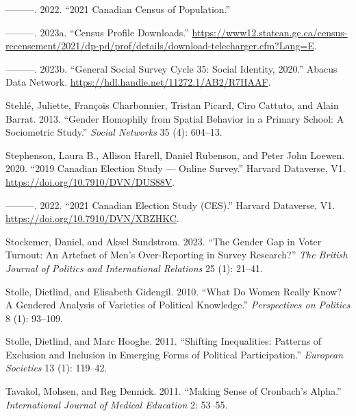 \documentclass[
  letterpaper,
  DIV=11,
  numbers=noendperiod]{scrreprt}
\newlength{\cslhangindent}
\newlength{\cslentryspacingunit} %
\newenvironment{CSLReferences}[2] %
 {%
  \setlength{\parindent}{0pt}
  \ifodd #1
  \let\oldpar\par
  \def\par{\hangindent=\cslhangindent\oldpar}
  \fi
  \setlength{\parskip}{#2\cslentryspacingunit}
 }%
 {}
\begin{document}
\begin{CSLReferences}{1}{0}
\leavevmode{}%
---------. 2022. {``{2021 Canadian Census of Population}.''}

\leavevmode{}%
---------. 2023a. {``{Census Profile Downloads}.''}
\url{https://www12.statcan.gc.ca/census-recensement/2021/dp-pd/prof/details/download-telecharger.cfm?Lang=E}.

\leavevmode{}%
---------. 2023b. {``{General Social Survey Cycle 35: Social Identity,
2020}.''} Abacus Data Network.
\url{https://hdl.handle.net/11272.1/AB2/R7HAAF}.

\leavevmode{}%
Stehlé, Juliette, François Charbonnier, Tristan Picard, Ciro Cattuto,
and Alain Barrat. 2013. {``{Gender Homophily from Spatial Behavior in a
Primary School: A Sociometric Study}.''} \emph{Social Networks} 35 (4):
604--13.

\leavevmode{}%
Stephenson, Laura B., Allison Harell, Daniel Rubenson, and Peter John
Loewen. 2020. {``{2019 Canadian Election Study --- Online Survey}.''}
Harvard Dataverse, V1. \url{https://doi.org/10.7910/DVN/DUS88V}.

\leavevmode{}%
---------. 2022. {``{2021 Canadian Election Study (CES)}.''} Harvard
Dataverse, V1. \url{https://doi.org/10.7910/DVN/XBZHKC}.

\leavevmode{}%
Stockemer, Daniel, and Aksel Sundstrom. 2023. {``{The Gender Gap in
Voter Turnout: An Artefact of Men's Over-Reporting in Survey
Research?}''} \emph{The British Journal of Politics and International
Relations} 25 (1): 21--41.

\leavevmode{}%
Stolle, Dietlind, and Elisabeth Gidengil. 2010. {``{What Do Women Really
Know? A Gendered Analysis of Varieties of Political Knowledge}.''}
\emph{Perspectives on Politics} 8 (1): 93--109.

\leavevmode{}%
Stolle, Dietlind, and Marc Hooghe. 2011. {``{Shifting Inequalities:
Patterns of Exclusion and Inclusion in Emerging Forms of Political
Participation}.''} \emph{European Societies} 13 (1): 119--42.

\leavevmode{}%
Tavakol, Mohsen, and Reg Dennick. 2011. {``{Making Sense of Cronbach's
Alpha}.''} \emph{International Journal of Medical Education} 2: 53--55.


\end{CSLReferences}
\end{document}
